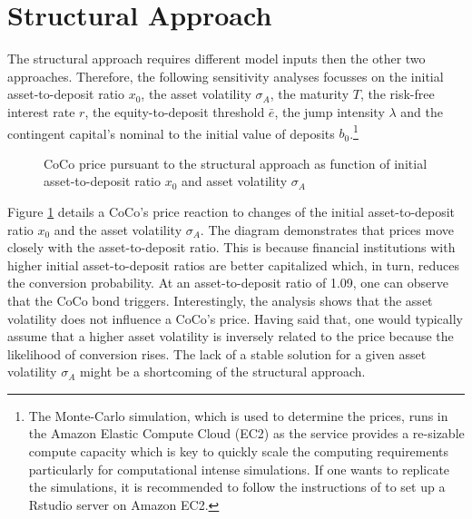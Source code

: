 \section{Structural Approach}\label{sensistructural}
The structural approach requires different model inputs then the other two approaches. Therefore, the following sensitivity analyses focusses on the initial asset-to-deposit ratio $x_0$, the asset volatility $\sigma_A$, the maturity $T$, the risk-free interest rate $r$, the equity-to-deposit threshold $\bar{e}$, the jump intensity $\lambda$ and the contingent capital's nominal to the initial value of deposits $b_0$.\footnote{The Monte-Carlo simulation, which is used to determine the prices, runs in the Amazon Elastic Compute Cloud (EC2) as the service provides a re-sizable compute capacity which is key to quickly scale the computing requirements particularly for computational intense simulations. If one wants to replicate the simulations, it is recommended to follow the instructions of \citet{amazonrstudio} to set up a Rstudio server on Amazon EC2.} 

\begin{figure}[H]
\centering
    \caption[CoCo price pursuant to the structural approach as function of asset-to-deposit ratio and asset volatility]{CoCo price pursuant to the structural approach as function of initial asset-to-deposit ratio $x_0$ and asset volatility $\sigma_A$}
  \label{fig:sa1}
  \end{figure}
  
Figure \ref{fig:sa1} details a CoCo's price reaction to changes of the initial asset-to-deposit ratio $x_0$ and the asset volatility $\sigma_A$. The diagram demonstrates that prices move closely with the asset-to-deposit ratio. This is because financial institutions with higher initial asset-to-deposit ratios are better capitalized which, in turn, reduces the conversion probability. At an asset-to-deposit ratio of 1.09, one can observe that the CoCo bond triggers. Interestingly, the analysis shows that the asset volatility does not influence a CoCo's price. Having said that, one would typically assume that a higher asset volatility is inversely related to the price because the likelihood of conversion rises. The lack of a stable solution for a given asset volatility $\sigma_A$ might be a shortcoming of the structural approach.\\

